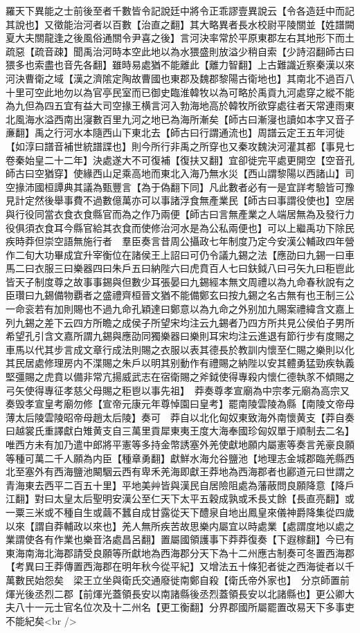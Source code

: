 羅天下異能之士前後至者千數皆令記說廷中將令正乖謬壹異說云【令各造廷中而記其說也】又徵能治河者以百數【治直之翻】其大略異者長水校尉平陵關並【姓譜闕夏大夫關龍逢之後風俗通關令尹喜之後】言河決率常於平原東郡左右其地形下而土疏惡【疏音疎】聞禹治河時本空此地以為水猥盛則放溢少稍自索【少詩沼翻師古曰猥多也索盡也音先各翻】雖時易處猶不能離此【離力智翻】上古難識近察秦漢以來河決曹衛之域【漢之濟隂定陶故曹國也東郡及魏郡黎陽古衛地也】其南北不過百八十里可空此地勿以為官亭民室而已御史臨淮韓牧以為可略於禹貢九河處穿之縱不能為九但為四五宜有益大司空掾王横言河入勃海地高於韓牧所欲穿處往者天常連雨東北風海水溢西南出寖數百里九河之地已為海所漸矣【師古曰漸寖也讀如本字又音子亷翻】禹之行河水本隨西山下東北去【師古曰行謂通流也】周譜云定王五年河徙【如淳曰譜音補世統譜諜也】則今所行非禹之所穿也又秦攻魏決河灌其都【事見七卷秦始皇二十二年】決處遂大不可復補【復扶又翻】宜卻徙完平處更開空【空音孔師古曰空猶穿】使緣西山足乘高地而東北入海乃無水災【西山謂黎陽以西諸山】司空掾沛國桓譚典其議為甄豐言【為于偽翻下同】凡此數者必有一是宜詳考驗皆可豫見計定然後舉事費不過數億萬亦可以事諸浮食無產業民【師古曰事謂役使也】空居與行役同當衣食衣食縣官而為之作乃兩便【師古曰言無產業之人端居無為及發行力役俱須衣食耳今縣官給其衣食而使修治河水是為公私兩便也】可以上繼禹功下除民疾時莽但崇空語無施行者　羣臣奏言昔周公攝政七年制度乃定今安漢公輔政四年營作二旬大功畢成宜升宰衡位在諸侯王上詔曰可仍令議九錫之法【應劭曰九錫一曰車馬二曰衣服三曰樂器四曰朱戶五曰納陛六曰虎賁百人七曰鈇鉞八曰弓矢九曰秬鬯此皆天子制度尊之故事事錫與但數少耳張晏曰九錫經本無文周禮以為九命春秋說有之臣瓚曰九錫備物覇者之盛禮齊桓晉文猶不能備鄭玄曰按九錫之名古無有也王制三公一命衮若有加則賜也不過九命孔穎達曰鄭意以為九命之外别加九賜案禮緯含文嘉上列九錫之差下云四方所瞻之成侯子所望宋均注云九錫者乃四方所共見公侯伯子男所希望孔引含文嘉所謂九錫與應劭同獨樂器曰樂則耳宋均注云進退有節行步有度賜之車馬以代其步言成文章行成法則賜之衣服以表其德長於教訓内懷至仁賜之樂則以化其民居處修理房内不渫賜之朱戶以明其别動作有禮賜之納陛以安其體勇猛勁疾執義堅彊賜之虎賁以備非常亢揚威武志在宿衛賜之斧鉞使得專殺内懷仁德執㒸不傾賜之弓矢使得專征孝慈父母賜之秬鬯以事先祖】　莽奏尊孝宣廟為中宗孝元廟為高宗又奏毁孝宣皇考廟勿修【宣帝元康元年尊悼園曰皇考】罷南陵雲陵為縣【南陵文帝母薄太后陵雲陵昭帝母趙太后陵】奏可　莽自以北化匈奴東致海外南懷黄支【莽自奏曰越裳氏重譯獻白雉黄支自三萬里貢犀東夷王度大海奉國珍匈奴單于順制去二名】唯西方未有加乃遣中郎將平憲等多持金幣誘塞外羌使獻地願内屬憲等奏言羌豪良願等種可萬二千人願為内臣【種章勇翻】獻鮮水海允谷鹽池【地理志金城郡臨羌縣西北至塞外有西海鹽池闞駰云西有卑禾羌海即獻王莽地為西海郡者也酈道元曰世謂之青海東去西平二百五十里】平地美艸皆與漢民自居險阻處為藩蔽問良願降意【降戶江翻】對曰太皇太后聖明安漢公至仁天下太平五穀成孰或禾長丈餘【長直亮翻】或一粟三米或不種自生或繭不蠶自成甘露從天下醴泉自地出鳳皇來儀神爵降集從四歲以來【謂自莽輔政以來也】羌人無所疾苦故思樂内屬宜以時處業【處謂度地以處之業謂使各有作業也樂音洛處昌呂翻】置屬國領護事下莽莽復奏【下遐稼翻】今已有東海南海北海郡請受良願等所獻地為西海郡分天下為十二州應古制奏可冬置西海郡　【考異曰王莽傳置西海郡在明年秋今從平紀】又增法五十條犯者徙之西海徙者以千萬數民始怨矣　梁王立坐與衛氏交通廢徙南鄭自殺【衛氏帝外家也】　分京師置前煇光後丞烈二郡【前煇光蓋領長安以南諸縣後丞烈蓋領長安以北諸縣也】更公卿大夫八十一元士官名位次及十二州名【更工衡翻】分界郡國所屬罷置改易天下多事吏不能紀矣<br />
